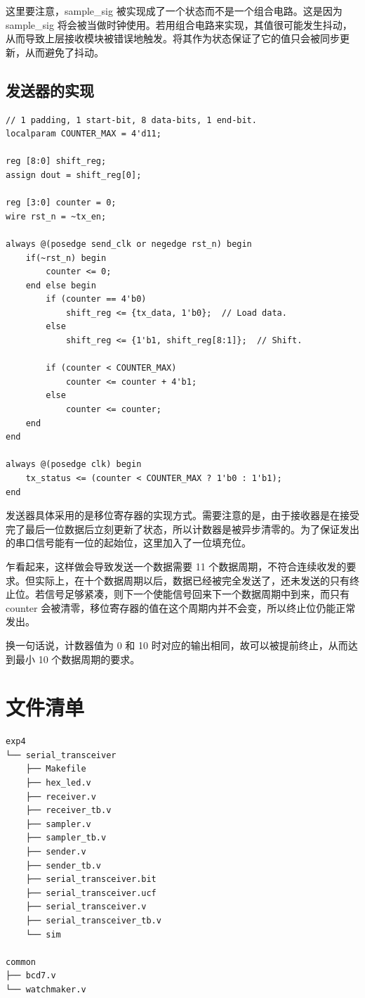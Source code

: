 \documentclass[11pt,a4paper]{article}
\begin{document}
这里要注意，sample\_sig 被实现成了一个状态而不是一个组合电路。这是因为 sample\_sig 将会被当做时钟使用。若用组合电路来实现，其值很可能发生抖动，从而导致上层接收模块被错误地触发。将其作为状态保证了它的值只会被同步更新，从而避免了抖动。


\subsection{发送器的实现}

\begin{verbatim}
// 1 padding, 1 start-bit, 8 data-bits, 1 end-bit.
localparam COUNTER_MAX = 4'd11;

reg [8:0] shift_reg;
assign dout = shift_reg[0];

reg [3:0] counter = 0;
wire rst_n = ~tx_en;

always @(posedge send_clk or negedge rst_n) begin
    if(~rst_n) begin
        counter <= 0;
    end else begin
        if (counter == 4'b0)
            shift_reg <= {tx_data, 1'b0};  // Load data.
        else
            shift_reg <= {1'b1, shift_reg[8:1]};  // Shift.

        if (counter < COUNTER_MAX)
            counter <= counter + 4'b1;
        else
            counter <= counter;
    end
end

always @(posedge clk) begin
    tx_status <= (counter < COUNTER_MAX ? 1'b0 : 1'b1);
end
\end{verbatim}

发送器具体采用的是移位寄存器的实现方式。需要注意的是，由于接收器是在接受完了最后一位数据后立刻更新了状态，所以计数器是被异步清零的。为了保证发出的串口信号能有一位的起始位，这里加入了一位填充位。

乍看起来，这样做会导致发送一个数据需要 11 个数据周期，不符合连续收发的要求。但实际上，在十个数据周期以后，数据已经被完全发送了，还未发送的只有终止位。若信号足够紧凑，则下一个使能信号回来下一个数据周期中到来，而只有 counter 会被清零，移位寄存器的值在这个周期内并不会变，所以终止位仍能正常发出。

换一句话说，计数器值为 0 和 10 时对应的输出相同，故可以被提前终止，从而达到最小 10 个数据周期的要求。

\section{文件清单}

\begin{Verbatim}[fontsize=\scriptsize]
exp4
└── serial_transceiver
    ├── Makefile
    ├── hex_led.v
    ├── receiver.v
    ├── receiver_tb.v
    ├── sampler.v
    ├── sampler_tb.v
    ├── sender.v
    ├── sender_tb.v
    ├── serial_transceiver.bit
    ├── serial_transceiver.ucf
    ├── serial_transceiver.v
    ├── serial_transceiver_tb.v
    └── sim

common
├── bcd7.v
└── watchmaker.v
\end{Verbatim}
\end{document}
